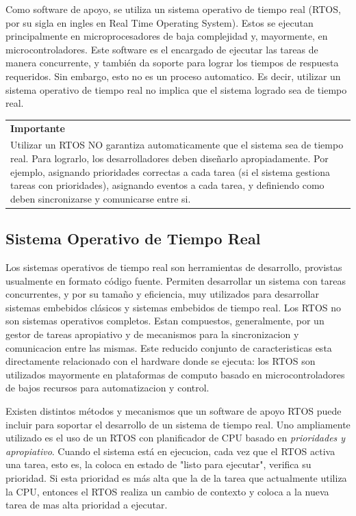 \documentclass[output=paper, 
colorlinks,
citecolor=brown,
newtxmath
]{langscibook}
\begin{document}
Como software de apoyo, se utiliza un sistema operativo de tiempo real 
(RTOS, por su sigla en ingles en Real Time Operating System).
Estos se ejecutan principalmente en microprocesadores de baja complejidad y, mayormente, en microcontroladores. 
Este software es el encargado de ejecutar las tareas de manera concurrente, y también da soporte para lograr los tiempos de respuesta requeridos.
Sin embargo, esto no es un proceso automatico. Es decir, utilizar un sistema 
operativo de tiempo real no implica que el sistema logrado sea de tiempo real. 


\begin{center}
\begin{tabularx}{\textwidth}{|X|}
\rowcolor{aliceblue}
\textbf{Importante}\\
	Utilizar un RTOS NO garantiza automaticamente que el sistema sea de tiempo real. Para lograrlo, los desarrolladores deben diseñarlo apropiadamente. Por ejemplo, asignando prioridades correctas a cada tarea (si el sistema gestiona tareas con prioridades), asignando eventos a cada tarea, y definiendo como deben sincronizarse y comunicarse entre si.
\end{tabularx}
\end{center}


\subsection{Sistema Operativo de Tiempo Real}

Los sistemas operativos de tiempo real son herramientas de desarrollo,
provistas usualmente en formato código fuente. Permiten desarrollar un
sistema con tareas concurrentes, y por su tamaño y eficiencia, muy
utilizados para desarrollar sistemas embebidos clásicos y sistemas
embebidos de tiempo real. Los RTOS no son sistemas operativos completos. 
Estan compuestos, generalmente, por un gestor de tareas apropiativo y 
de mecanismos para la sincronizacion y comunicacion entre las mismas. 
Este reducido conjunto de caracteristicas esta directamente relacionado 
con el hardware donde se ejecuta: 
los RTOS son utilizados mayormente en plataformas de computo 
basado en microcontroladores de bajos recursos para automatizacion y control.

Existen distintos métodos y mecanismos que un software de apoyo RTOS 
puede incluir para soportar el desarrollo de un sistema de tiempo real.
Uno ampliamente utilizado es el uso de un RTOS con planificador de CPU 
basado en \textit{prioridades y apropiativo}. Cuando el sistema está en ejecucion, cada vez que el RTOS activa una tarea, esto es, la coloca en estado de "listo para ejecutar", verifica su prioridad. Si esta prioridad es más alta que la de la tarea que actualmente utiliza la CPU, entonces el RTOS realiza un cambio de contexto y coloca a la nueva tarea de mas alta prioridad a ejecutar.
\end{document}

